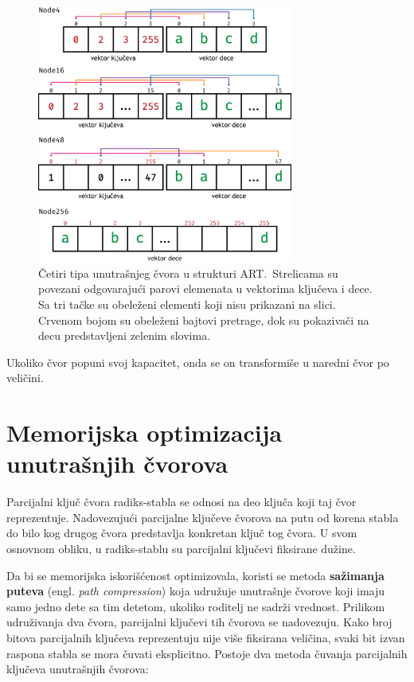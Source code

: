 \documentclass[12pt,oneside]{memoir}
\begin{document}
\begin{figure}[!h]
  \centering
  \includegraphics[width=0.75\textwidth]{radix_nodes.eps}
  \caption{Četiri tipa unutrašnjeg čvora u strukturi ART.\
    Strelicama su povezani
    odgovarajući parovi elemenata u vektorima ključeva i dece. Sa tri tačke
    su obeleženi elementi koji nisu prikazani na slici. Crvenom bojom su obeleženi
    bajtovi pretrage, dok su pokazivači na decu predstavljeni zelenim slovima.
  }
  \label{fig:radix_nodes}
\end{figure}

\noindent Ukoliko čvor popuni svoj kapacitet, onda se on transformiše u naredni
čvor po veličini.

\section{Memorijska optimizacija unutrašnjih čvorova}

Parcijalni ključ čvora radiks-stabla se odnosi na deo ključa
koji taj čvor reprezentuje.
Nadovezujući parcijalne ključeve čvorova na putu od korena stabla
do bilo kog drugog čvora predstavlja konkretan ključ tog čvora.
U svom osnovnom obliku, u radiks-stablu su parcijalni ključevi
fiksirane dužine.

Da bi se memorijska iskorišćenost optimizovala, koristi se metoda
\textbf{sažimanja puteva} (engl. \emph{path compression}) koja udružuje unutrašnje
čvorove koji imaju samo jedno dete sa tim detetom, ukoliko roditelj ne sadrži
vrednost. Prilikom udruživanja dva čvora,
parcijalni ključevi tih čvorova se nadovezuju.
Kako broj bitova parcijalnih ključeva reprezentuju nije više
fiksirana veličina, svaki bit izvan raspona stabla se mora čuvati
eksplicitno. Postoje dva metoda čuvanja parcijalnih ključeva unutrašnjih
čvorova:
\end{document}

